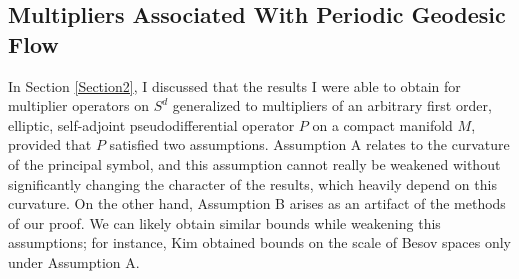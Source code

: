 \documentclass[11pt]{article}
\begin{document}




\subsection{Multipliers Associated With Periodic Geodesic Flow}

In Section \ref{Section2}, I discussed that the results I were able to obtain for multiplier operators on $S^d$ generalized to multipliers of an arbitrary first order, elliptic, self-adjoint pseudodifferential operator $P$ on a compact manifold $M$, provided that $P$ satisfied two assumptions. Assumption A relates to the curvature of the principal symbol, and this assumption cannot really be weakened without significantly changing the character of the results, which heavily depend on this curvature. On the other hand, Assumption B arises as an artifact of the methods of our proof. We can likely obtain similar bounds while weakening this assumptions; for instance, Kim \cite{KimManifold} obtained bounds on the scale of Besov spaces only under Assumption A.
\end{document}
